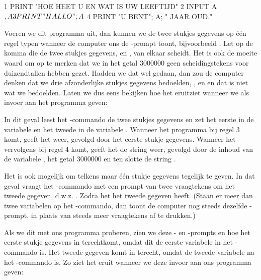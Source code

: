 \begin{screencode}
  1 PRINT "HOE HEET U EN WAT IS UW LEEFTIJD"
  2 INPUT A$, A
  3 PRINT "HALLO "; A$
  4 PRINT "U BENT"; A; " JAAR OUD."
\end{screencode}

\needspace{4cm}
Voeren we dit programma uit, dan kunnen we de twee stukjes gegevens op één regel typen wanneer de computer ons de -prompt toont, bijvoorbeeld . Let op de komma die de twee stukjes gegevens,  en , van elkaar scheidt. Het is ook de moeite waard om op te merken dat we in het getal 3000000 geen scheidingstekens voor duizendtallen hebben gezet. Hadden we dat wel gedaan, dan zou de computer denken dat we drie afzonderlijke stukjes gegevens bedoelden, ,  en  en dat is niet wat we bedoelden. Laten we dus eens bekijken hoe het eruitziet wanneer we  als invoer aan het programma geven:


In dit geval leest het -commando de twee stukjes gegevens en zet het eerste in de variabele  en het tweede in de variabele . Wanneer het programma bij regel 3 komt, geeft het  weer, gevolgd door het eerste stukje gegevens. Wanneer het vervolgens bij regel 4 komt, geeft het de string  weer, gevolgd door de inhoud van de variabele , het getal 3000000 en ten slotte de string .

Het is ook mogelijk om telkens maar één stukje gegevens tegelijk te geven. In dat geval vraagt het -commando met een prompt van twee vraagtekens om het tweede gegeven, d.w.z. . Zodra het het tweede gegeven heeft.  (Staan er meer dan twee variabelen op het -commando, dan toont de computer nog steeds dezelfde -prompt, in plaats van steeds meer vraagtekens af te drukken.)

\needspace{4cm}
Als we dit met ons programma proberen, zien we deze - en -prompts en hoe het eerste stukje gegevens in  terechtkomt, omdat dit de eerste variabele in het -commando is. Het tweede gegeven komt in  terecht, omdat  de tweede variabele na het -commando is. Zo ziet het eruit wanneer we deze invoer aan ons programma geven:



